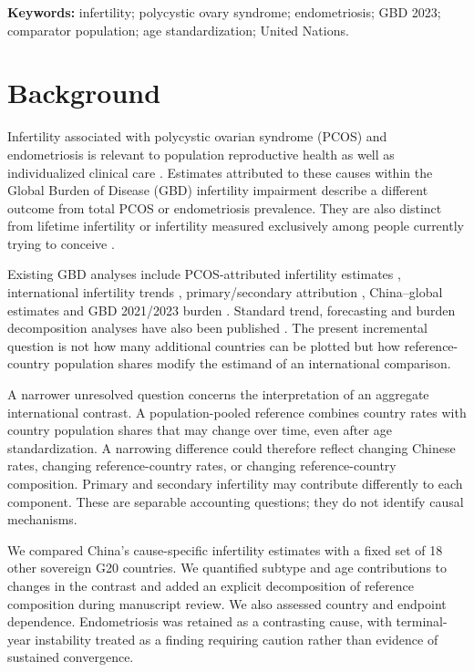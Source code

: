 \documentclass[11pt,a4paper]{article}
\begin{document}
\textbf{Keywords:} infertility; polycystic ovary syndrome; endometriosis; GBD 2023; comparator population; age standardization; United Nations.

\section{Background}
Infertility associated with polycystic ovarian syndrome (PCOS) and endometriosis is relevant to population reproductive health as well as individualized clinical care \cite{pcos,eshre}. Estimates attributed to these causes within the Global Burden of Disease (GBD) infertility impairment describe a different outcome from total PCOS or endometriosis prevalence. They are also distinct from lifetime infertility or infertility measured exclusively among people currently trying to conceive \cite{gbd}.

Existing GBD analyses include PCOS-attributed infertility estimates \cite{liu_pcos2024}, international infertility trends \cite{liang2025}, primary/secondary attribution \cite{xu}, China--global estimates \cite{lu} and GBD 2021/2023 burden \cite{wang}. Standard trend, forecasting and burden decomposition analyses have also been published \cite{feng}. The present incremental question is not how many additional countries can be plotted but how reference-country population shares modify the estimand of an international comparison.

A narrower unresolved question concerns the interpretation of an aggregate international contrast. A population-pooled reference combines country rates with country population shares that may change over time, even after age standardization. A narrowing difference could therefore reflect changing Chinese rates, changing reference-country rates, or changing reference-country composition. Primary and secondary infertility may contribute differently to each component. These are separable accounting questions; they do not identify causal mechanisms.

We compared China's cause-specific infertility estimates with a fixed set of 18 other sovereign G20 countries. We quantified subtype and age contributions to changes in the contrast and added an explicit decomposition of reference composition during manuscript review. We also assessed country and endpoint dependence. Endometriosis was retained as a contrasting cause, with terminal-year instability treated as a finding requiring caution rather than evidence of sustained convergence.
\end{document}
